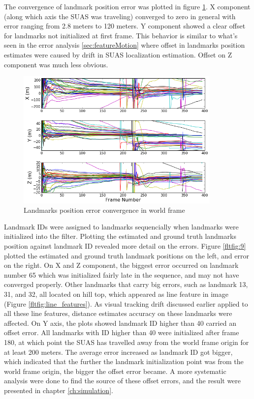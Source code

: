 The convergence of landmark position error was plotted in figure
\ref{fltfig:8}. X component (along which axis the SUAS was traveling)
converged to zero in general with error ranging from 2.8 meters to 120
meters. Y component showed a clear offset for landmarks not initialized
at first frame. This behavior is similar to what's seen in the
error analysis \ref{sec:featureMotion} where offset in landmarks
position estimates were caused by drift in SUAS localization
estimation. Offset on Z component was much less obvious.

\begin{figure}[h]
\centering
\includegraphics[width=10cm, keepaspectratio=true]
{./Figures/fltfig/cut1/Figure50.png}
\caption{Landmarks position error convergence in world frame}
\label{fltfig:8}
\end{figure}

Landmark IDs were assigned to landmarks sequencially when landmarks
were initialized into the filter. Plotting the estimated and ground
truth landmarks position against landmark ID revealed more detail on
the errors. Figure \ref{fltfig:9} plotted the estimated and ground
truth landmark positions on the left, and error on the right. On X and
Z component, the biggest error occurred on landmark number 65 which
was initialized fairly late in the sequence, and may not have
converged properly. Other landmarks that carry big errors, such as
landmark 13, 31, and 32, all located on hill top, which appeared as
line feature in image (Figure \ref{fltfig:line_features}). As visual
tracking drift discussed earlier applied to all these line features,
distance estimates accuracy on these landmarks were affected. On Y
axis, the plots showed landmark ID higher than 40 carried an offset
error. All landmarks with ID higher than 40 were initialized after
frame 180, at which point the SUAS has travelled away from the world
frame origin for at least 200 meters. The average error increased as
landmark ID got bigger, which indicated that the further the landmark
initialization point was from the world frame origin, the bigger the
offset error became. A more systematic analysis were done to find the
source of these offset errors, and the result were presented in
chapter \ref{ch:simulation}.

